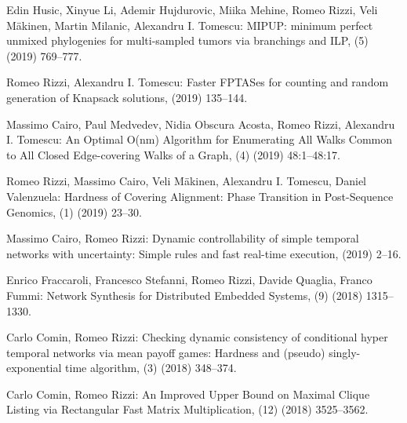 \begin{etaremune}
  \item {\sc Edin Husic, Xinyue Li, Ademir Hujdurovic, Miika Mehine, Romeo Rizzi, Veli Mäkinen, Martin Milanic, Alexandru I. Tomescu:}
   \newblock MIPUP: minimum perfect unmixed phylogenies for multi-sampled tumors via branchings and ILP,
   (5) (2019) 769--777.

  \item {\sc Romeo Rizzi, Alexandru I. Tomescu:}
   \newblock Faster FPTASes for counting and random generation of Knapsack solutions,
    (2019) 135--144.

  \item {\sc Massimo Cairo, Paul Medvedev, Nidia Obscura Acosta, Romeo Rizzi, Alexandru I. Tomescu:}
   \newblock An Optimal O(nm) Algorithm for Enumerating All Walks Common to All Closed Edge-covering Walks of a Graph,
   (4) (2019) 48:1--48:17.

  \item {\sc Romeo Rizzi, Massimo Cairo, Veli Mäkinen, Alexandru I. Tomescu, Daniel Valenzuela:}
   \newblock Hardness of Covering Alignment: Phase Transition in Post-Sequence Genomics,
   (1) (2019) 23--30.

  \item {\sc Massimo Cairo, Romeo Rizzi:}
   \newblock Dynamic controllability of simple temporal networks with uncertainty: Simple rules and fast real-time execution,
    (2019) 2--16.

  \item {\sc Enrico Fraccaroli, Francesco Stefanni, Romeo Rizzi, Davide Quaglia, Franco Fummi:}
   \newblock Network Synthesis for Distributed Embedded Systems,
   (9) (2018) 1315--1330.

  \item {\sc Carlo Comin, Romeo Rizzi:}
   \newblock Checking dynamic consistency of conditional hyper temporal networks via mean payoff games: Hardness and (pseudo) singly-exponential time algorithm,
   (3) (2018) 348--374.

  \item {\sc Carlo Comin, Romeo Rizzi:}
    \newblock An Improved Upper Bound on Maximal Clique Listing via Rectangular Fast Matrix Multiplication,
    (12) (2018) 3525--3562.
   

\end{etaremune}
